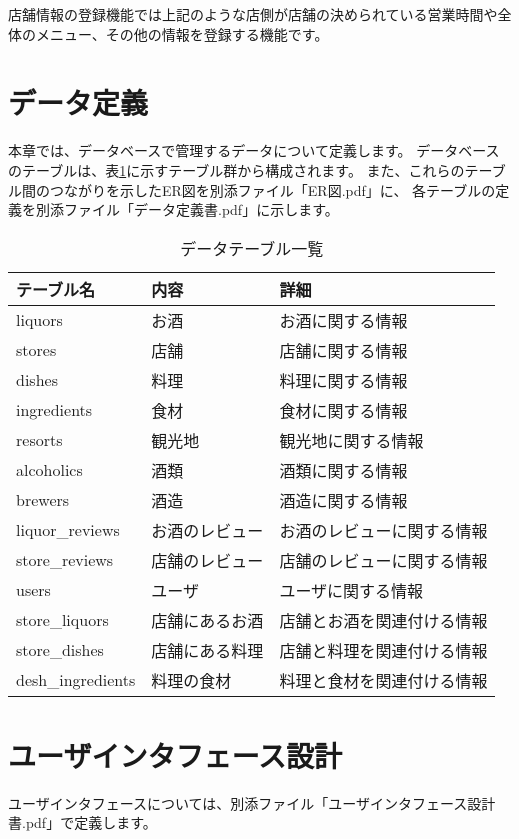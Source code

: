 \documentclass[a4j,titlepage]{jarticle}
\begin{document}
店舗情報の登録機能では上記のような店側が店舗の決められている営業時間や全体のメニュー、その他の情報を登録する機能です。
\section{データ定義}
本章では、データベースで管理するデータについて定義します。
データベースのテーブルは、表\ref{tables}に示すテーブル群から構成されます。
また、これらのテーブル間のつながりを示したER図を別添ファイル「ER図.pdf」に、
各テーブルの定義を別添ファイル「データ定義書.pdf」に示します。
​
\begin{table}[!htbp]
\caption{データテーブル一覧}
\label{tables}
\begin{center}
\begin{tabular}{|l|l|l|}\hline
テーブル名 & 内容 & 詳細\\\hline\hline
liquors & お酒 & お酒に関する情報\\\hline
stores & 店舗 & 店舗に関する情報\\\hline
dishes & 料理 & 料理に関する情報\\\hline
ingredients & 食材 & 食材に関する情報\\\hline
resorts & 観光地 & 観光地に関する情報\\\hline
alcoholics & 酒類 & 酒類に関する情報\\\hline
brewers & 酒造 & 酒造に関する情報\\\hline
liquor\_reviews & お酒のレビュー & お酒のレビューに関する情報\\\hline
store\_reviews & 店舗のレビュー & 店舗のレビューに関する情報\\\hline
users & ユーザ & ユーザに関する情報\\\hline
store\_liquors & 店舗にあるお酒 & 店舗とお酒を関連付ける情報\\\hline
store\_dishes & 店舗にある料理 & 店舗と料理を関連付ける情報\\\hline
desh\_ingredients & 料理の食材 & 料理と食材を関連付ける情報\\\hline
\end{tabular}
\end{center}
\end{table}

\section{ユーザインタフェース設計}
ユーザインタフェースについては、別添ファイル「ユーザインタフェース設計書.pdf」で定義します。
\end{document}
